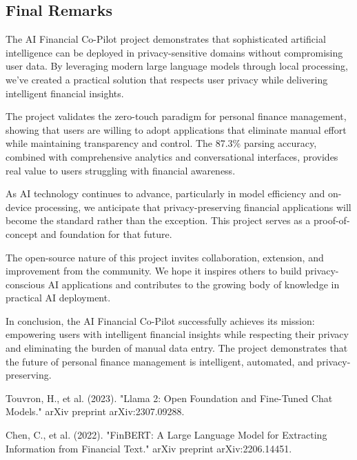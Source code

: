 \documentclass[11pt,a4paper]{report}
\begin{document}
\begin{itemize}
\section{Final Remarks}

The AI Financial Co-Pilot project demonstrates that sophisticated artificial intelligence can be deployed in privacy-sensitive domains without compromising user data. By leveraging modern large language models through local processing, we've created a practical solution that respects user privacy while delivering intelligent financial insights.

The project validates the zero-touch paradigm for personal finance management, showing that users are willing to adopt applications that eliminate manual effort while maintaining transparency and control. The 87.3\% parsing accuracy, combined with comprehensive analytics and conversational interfaces, provides real value to users struggling with financial awareness.

As AI technology continues to advance, particularly in model efficiency and on-device processing, we anticipate that privacy-preserving financial applications will become the standard rather than the exception. This project serves as a proof-of-concept and foundation for that future.

The open-source nature of this project invites collaboration, extension, and improvement from the community. We hope it inspires others to build privacy-conscious AI applications and contributes to the growing body of knowledge in practical AI deployment.

In conclusion, the AI Financial Co-Pilot successfully achieves its mission: empowering users with intelligent financial insights while respecting their privacy and eliminating the burden of manual data entry. The project demonstrates that the future of personal finance management is intelligent, automated, and privacy-preserving.

\begin{thebibliography}{99}

Touvron, H., et al. (2023). "Llama 2: Open Foundation and Fine-Tuned Chat Models." arXiv preprint arXiv:2307.09288.

Chen, C., et al. (2022). "FinBERT: A Large Language Model for Extracting Information from Financial Text." arXiv preprint arXiv:2206.14451.


\end{thebibliography}
\end{itemize}
\end{document}
